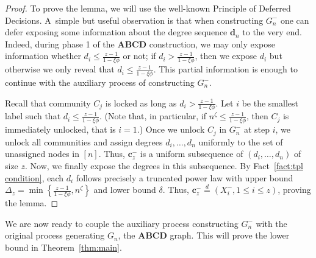 \documentclass[12pt]{article}
\theoremstyle{definition}
\theoremstyle{remark}
\theoremstyle{remark}
\numberwithin{theorem}{section}
\begin{document}
\begin{proof}
To prove the lemma, we will use the well-known Principle of Deferred Decisions. A~simple but useful observation is that when constructing $G_n^-$ one can defer exposing some information about the degree sequence $\textbf{d}_n$ to the very end. Indeed, during phase 1 of the \textbf{ABCD} construction, we may only expose information whether $d_i \leq \frac{z-1}{1-\xi \phi}$ or not; if $d_i > \frac{z-1}{1-\xi \phi}$, then we expose $d_i$ but otherwise we only reveal that $d_i \leq \frac{z-1}{1-\xi \phi}$. This partial information is enough to continue with the auxiliary process of constructing $G_n^-$.

Recall that community $C_j$ is locked as long as $d_i > \frac{z-1}{1-\xi \phi}$. Let $i$ be the smallest label such that $d_i \leq \frac{z-1}{1-\xi \phi}$. (Note that, in particular, if $n^{\zeta} \le \frac{z-1}{1-\xi \phi}$, then $C_j$ is immediately unlocked, that is $i=1$.) Once we unlock $C_j$ in $G_n^-$ at step $i$, we unlock all communities and assign degrees $d_i,\dots,d_n$ uniformly to the set of unassigned nodes in $[n]$. Thus, $\mathbf{c}_z^-$ is a uniform subsequence of $(d_i,\dots,d_n)$ of size $z$. Now, we finally expose the degrees in this subsequence. By Fact~\ref{fact:tpl condition}, each $d_i$ follows precisely a truncated power law with upper bound $\Delta_z = \min\left\{ \frac{z-1}{1-\xi \phi}, n^\zeta \right\}$ and lower bound $\delta$. Thus, $\mathbf{c}_z^- \stackrel{d}{=} (X_i^-, 1 \leq i \leq z)$, proving the lemma.
\end{proof}

We are now ready to couple the auxiliary process constructing $G_n^-$ with the original process generating $G_n$, the \textbf{ABCD} graph. This will prove the lower bound in Theorem~\ref{thm:main}.
\end{document}

